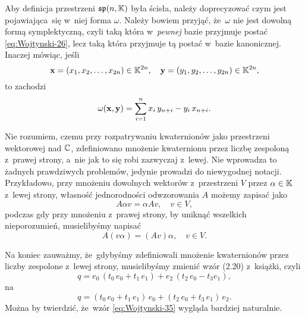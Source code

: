 \documentclass[a4paper,11pt]{article}
\begin{document}
\start {} Aby definicja przestrzeni $\mathfrak{sp}( n, \mathbb{K} )$ była
ścisła, należy doprecyzować czym jest pojawiająca~się w~niej forma $\omega$.
Należy bowiem przyjąć, że~$\omega$ nie jest dowolną formą symplektyczną, czyli
taką która w~\textit{pewnej} bazie przyjmuje postać
\eqref{eq:Wojtynski-26}, lecz taką która przyjmuje tą postać w~bazie
kanonicznej. Inaczej mówiąc, jeśli
\begin{equation}
  \label{eq:Wojtynski-30}
  \mathbf{x} = ( x_{ 1 }, x_{ 2 }, \ldots, x_{ 2n } ) \in \mathbb{K}^{ 2n }, \quad
  \mathbf{y} = ( y_{ 1 }, y_{ 2 }, \ldots, y_{ 2n } ) \in \mathbb{K}^{ 2n },
\end{equation}
to zachodzi
\begin{equation}
  \label{eq:Wojtynski-31}
  \omega( \mathbf{x}, \mathbf{y} ) =
  \sum_{ i = 1 }^{ n } x_{ i } \, y_{ n + i } - y_{ i } \, x_{ n + i }.
\end{equation}

\vspace{\spaceFour}





\start {} Nie rozumiem, czemu przy rozpatrywaniu kwaternionów jako
przestrzeni wektorowej nad $\mathbb{C}$, zdefiniowano mnożenie kwaternionu przez
liczbę zespoloną z~prawej strony, a~nie jak to się robi zazwyczaj z~lewej.
Nie wprowadza to żadnych prawdziwych problemów, jedynie prowadzi do
niewygodnej notacji. Przykładowo, przy mnożeniu dowolnych wektorów
z~przestrzeni $V$ przez $\alpha \in \mathbb{K}$ z~lewej strony, własność
jednorodności odwzorowania $A$ możemy zapisać jako
\begin{equation}
  \label{eq:Wojtynski-32}
  A \alpha v = \alpha A v, \quad v \in V,
\end{equation}
podczas gdy przy mnożeniu z~prawej strony, by uniknąć wszelkich
nieporozumień, musielibyśmy napisać
\begin{equation}
  \label{eq:Wojtynski-33}
  A ( v \alpha ) = ( A v ) \alpha, \quad v \in V.
\end{equation}

Na koniec zauważmy, że~gdybyśmy zdefiniowali mnożenie kwaternionów przez
liczby zespolone z~lewej strony, musielibyśmy zmienić wzór (2.20) z~książki,
czyli
\begin{equation}
  \label{eq:Wojtynski-34}
  q =
  e_{ 0 } \, ( t_{ 0 } \, e_{ 0 } + t_{ 1 } \, e_{ 1 } )
  + e_{ 2 } \, ( t_{ 2 } \, e_{ 0 } - t_{ 3 } e_{ 1 } ),
\end{equation}
na
\begin{equation}
  \label{eq:Wojtynski-35}
  q =
  ( t_{ 0 } \, e_{ 0 } + t_{ 1 } \, e_{ 1 } ) \, e_{ 0 }
  + ( t_{ 2 } \, e_{ 0 } + t_{ 3 } \, e_{ 1 } ) \, e_{ 2 }.
\end{equation}
Można by twierdzić, że~wzór \eqref{eq:Wojtynski-35} wygląda bardziej
naturalnie.
\end{document}
